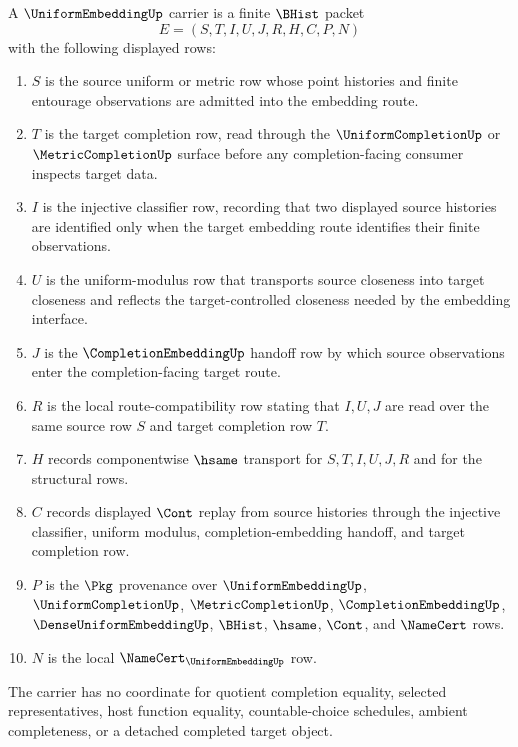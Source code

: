 \begin{definition}
\label{def:uniform-embedding-carrier}
A $\UniformEmbeddingUp$ carrier is a finite $\BHist$ packet
$$
E=(S,T,I,U,J,R,H,C,P,N)
$$
with the following displayed rows:
\begin{enumerate}
\item $S$ is the source uniform or metric row whose point histories and finite entourage observations are admitted into the embedding route.
\item $T$ is the target completion row, read through the $\UniformCompletionUp$ or $\MetricCompletionUp$ surface before any completion-facing consumer inspects target data.
\item $I$ is the injective classifier row, recording that two displayed source histories are identified only when the target embedding route identifies their finite observations.
\item $U$ is the uniform-modulus row that transports source closeness into target closeness and reflects the target-controlled closeness needed by the embedding interface.
\item $J$ is the $\CompletionEmbeddingUp$ handoff row by which source observations enter the completion-facing target route.
\item $R$ is the local route-compatibility row stating that $I,U,J$ are read over the same source row $S$ and target completion row $T$.
\item $H$ records componentwise $\hsame$ transport for $S,T,I,U,J,R$ and for the structural rows.
\item $C$ records displayed $\Cont$ replay from source histories through the injective classifier, uniform modulus, completion-embedding handoff, and target completion row.
\item $P$ is the $\Pkg$ provenance over $\UniformEmbeddingUp$, $\UniformCompletionUp$, $\MetricCompletionUp$, $\CompletionEmbeddingUp$, $\DenseUniformEmbeddingUp$, $\BHist$, $\hsame$, $\Cont$, and $\NameCert$ rows.
\item $N$ is the local $\NameCert_{\UniformEmbeddingUp}$ row.
\end{enumerate}
The carrier has no coordinate for quotient completion equality, selected representatives, host function equality, countable-choice schedules, ambient completeness, or a detached completed target object.
\end{definition}

